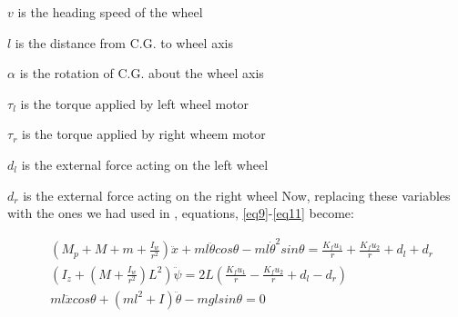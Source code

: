 \documentclass[a4paper,10pt]{article}
\begin{document}
$v$ is the heading speed of the wheel

$l$ is the distance from C.G. to wheel axis

$\alpha$ is the rotation of C.G. about the wheel axis

$\tau_l$ is the torque applied by left wheel motor

$\tau_r$ is the torque applied by right wheem motor

$d_l$ is the external force acting on the left wheel

$d_r$ is the external force acting on the right wheel
\newline
Now, replacing these variables with the ones we had used in \cite{munzir2013balancing}, 
equations, \ref{eq9}-\ref{eq11} become:

\begin{align}
 &\left(M_p+M+m+\frac{I_w}{r^2}\right)\ddot{x}+ml\ddot{\theta}cos\theta-ml{\dot{\theta}}^2sin\theta = \frac{K_fu_1}{r}+\frac{K_fu_2}{r}+d_l+d_r \label{eq12} \\
 &\left(I_z+\left(M+\frac{I_w}{r^2}\right)L^2\right)\ddot{\psi}=2L\left(\frac{K_fu_1}{r}-\frac{K_fu_2}{r}+d_l-d_r\right) \label{eq13} \\
 &ml\ddot{x}cos\theta+\left(ml^2+I\right)\ddot{\theta}-mglsin\theta=0 \label{eq14}
\end{align}
\end{document}
